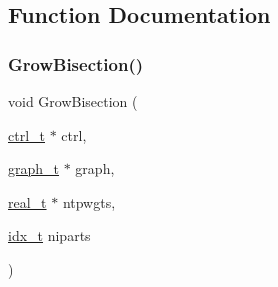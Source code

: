 \subsection{Function Documentation}
\mbox{\label{a00903_aa565fcd8af582579b67153287a07ea69}} 
\subsubsection{\texorpdfstring{Grow\+Bisection()}{GrowBisection()}}
{\footnotesize\ttfamily void Grow\+Bisection (\begin{DoxyParamCaption}\item[{\hyperlink{a00742}{ctrl\+\_\+t} $\ast$}]{ctrl,  }\item[{\hyperlink{a00734}{graph\+\_\+t} $\ast$}]{graph,  }\item[{\hyperlink{a00876_a1924a4f6907cc3833213aba1f07fcbe9}{real\+\_\+t} $\ast$}]{ntpwgts,  }\item[{\hyperlink{a00876_aaa5262be3e700770163401acb0150f52}{idx\+\_\+t}}]{niparts }\end{DoxyParamCaption})}

